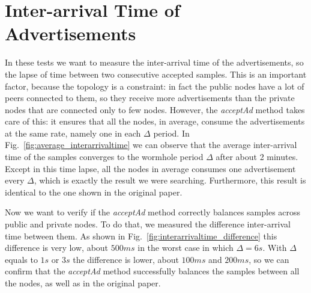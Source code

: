 \section{Inter-arrival Time of Advertisements}
\label{sec:interarrivaltime}
In these tests we want to measure the inter-arrival time of the advertisements, so the lapse of time between two consecutive accepted samples. This is an important factor, because the topology is a constraint: in fact the public nodes have a lot of peers connected to them, so they receive more advertisements than the private nodes that are connected only to few nodes. However, the \textit{acceptAd} method takes care of this: it ensures that all the nodes, in average, consume the advertisements at the same rate, namely one in each $\Delta$ period. In Fig.~\ref{fig:average_interarrivaltime} we can observe that the average inter-arrival time of the samples converges to the wormhole period $\Delta$ after about 2 minutes. Except in this time lapse, all the nodes in average consumes one advertisement every $\Delta$, which is exactly the result we were searching. Furthermore, this result is identical to the one shown in the original paper.

Now we want to verify if the \textit{acceptAd} method correctly balances samples across public and private nodes. To do that, we measured the difference inter-arrival time between them. As shown in Fig.~\ref{fig:interarrivaltime_difference} this difference is very low, about $500 ms$ in the worst case in which $\Delta = 6 s$. With $\Delta$ equals to $1s$ or $3s$ the difference is lower, about $100ms$ and $200ms$, so we can confirm that the \textit{acceptAd} method successfully balances the samples between all the nodes, as well as in the original paper.


